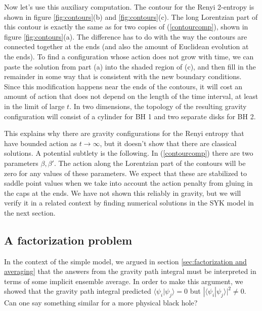 \documentclass[11pt]{article}
\numberwithin{equation}{section}
\begin{document}
Now let's use this auxiliary computation. The contour for the Renyi 2-entropy is shown in figure \ref{fig:contours}(b) and \ref{fig:contours}(c). The long Lorentzian part of this contour is exactly the same as for two copies of (\ref{contourcomp}), shown in figure \ref{fig:contours}(a). The difference has to do with the way the contours are connected together at the ends (and also the amount of Euclidean evolution at the ends). To find a configuration whose action does not grow with time, we can paste the solution from part (a) into the shaded region of (c), and then fill in the remainder in some way that is consistent with the new boundary conditions. Since this modification happens near the ends of the contours, it will cost an amount of action that does not depend on the length of the time interval, at least in the limit of large $t$. In two dimensions, the topology of the resulting gravity configuration will consist of a cylinder for BH 1 and two separate disks for BH 2.

This explains why there are gravity configurations for the Renyi entropy that have bounded action as $t\rightarrow \infty$, but it doesn't show that there are classical solutions. A potential subtlety is the following. In (\ref{contourcomp}) there are two parameters $\beta,\beta'$. The action along the Lorentzian part of the contours will be zero for any values of these parameters. We expect that these are stabilized to saddle point values when we take into account the action penalty from gluing in the caps at the ends. We have not shown this reliably in gravity, but we will verify it in a related context by finding numerical solutions in the SYK model in the next section.


\subsection{A factorization problem}\label{sec:factorizationProblem}
In the context of the simple model, we argued in section \ref{sec:factorization and averaging} that the answers from the gravity path integral must be interpreted in terms of some implicit ensemble average. In order to make this argument, we showed that the gravity path integral predicted $\langle \psi_i|\psi_j\rangle = 0$ but $|\langle \psi_i|\psi_j\rangle|^2 \neq 0$. Can one say something similar for a more physical black hole?
\end{document}
